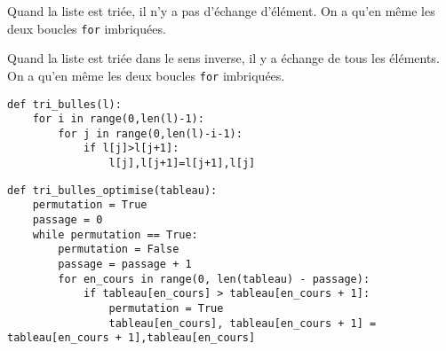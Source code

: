 \ifprof
Quand la liste est triée, il n'y a pas d'échange d'élément. On a qu'en même les deux boucles \texttt{for} imbriquées.
\else\fi

\ifprof
Quand la liste est triée dans le sens inverse, il y a échange de tous les éléments. On a qu'en même les deux boucles \texttt{for} imbriquées.
\else\fi

\ifprof
\begin{lstlisting}
def tri_bulles(l):
    for i in range(0,len(l)-1):
        for j in range(0,len(l)-i-1):
            if l[j]>l[j+1]:
                l[j],l[j+1]=l[j+1],l[j]
\end{lstlisting}
\else\fi

\ifprof
\begin{lstlisting}
def tri_bulles_optimise(tableau):
    permutation = True
    passage = 0
    while permutation == True:
        permutation = False
        passage = passage + 1
        for en_cours in range(0, len(tableau) - passage):
            if tableau[en_cours] > tableau[en_cours + 1]:
                permutation = True
                tableau[en_cours], tableau[en_cours + 1] = tableau[en_cours + 1],tableau[en_cours]
\end{lstlisting}
\else\fi